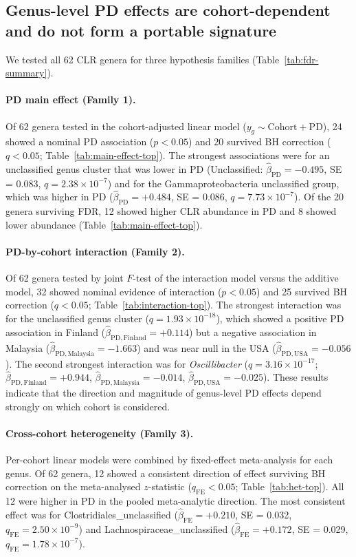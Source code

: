 \documentclass[12pt,a4paper]{article}
\begin{document}
\subsection{Genus-level PD effects are cohort-dependent and do not form
a portable signature}
\label{sec:genus}

We tested all 62 CLR genera for three hypothesis families
(Table~\ref{tab:fdr-summary}).

\paragraph{PD main effect (Family 1).}
Of 62 genera tested in the cohort-adjusted linear model
($y_g \sim \mathrm{Cohort} + \mathrm{PD}$), 24 showed a nominal PD
association ($p < 0.05$) and 20 survived BH correction ($q < 0.05$;
Table~\ref{tab:main-effect-top}). The strongest associations were for
an unclassified genus cluster that was lower in PD (Unclassified:
$\hat\beta_{\mathrm{PD}} = -0.495$, SE = 0.083, $q = 2.38 \times 10^{-7}$)
and for the Gammaproteobacteria unclassified group, which was higher in PD
($\hat\beta_{\mathrm{PD}} = +0.484$, SE = 0.086, $q = 7.73 \times 10^{-7}$).
Of the 20 genera surviving FDR, 12 showed higher CLR abundance in PD and
8 showed lower abundance (Table~\ref{tab:main-effect-top}).

\paragraph{PD-by-cohort interaction (Family 2).}
Of 62 genera tested by joint $F$-test of the interaction model versus the
additive model, 32 showed nominal evidence of interaction ($p < 0.05$) and
25 survived BH correction ($q < 0.05$; Table~\ref{tab:interaction-top}).
The strongest interaction was for the unclassified genus cluster
($q = 1.93 \times 10^{-18}$), which showed a positive PD association in
Finland ($\hat\beta_{\mathrm{PD,Finland}} = +0.114$) but a negative
association in Malaysia ($\hat\beta_{\mathrm{PD,Malaysia}} = -1.663$) and
was near null in the USA ($\hat\beta_{\mathrm{PD,USA}} = -0.056$). The
second strongest interaction was for \textit{Oscillibacter}
($q = 3.16 \times 10^{-17}$; $\hat\beta_{\mathrm{PD,Finland}} = +0.944$,
$\hat\beta_{\mathrm{PD,Malaysia}} = -0.014$,
$\hat\beta_{\mathrm{PD,USA}} = -0.025$). These results indicate that the
direction and magnitude of genus-level PD effects depend strongly on which
cohort is considered.

\paragraph{Cross-cohort heterogeneity (Family 3).}
Per-cohort linear models were combined by fixed-effect meta-analysis for
each genus. Of 62 genera, 12 showed a consistent direction of effect
surviving BH correction on the meta-analysed $z$-statistic ($q_{\mathrm{FE}}
< 0.05$; Table~\ref{tab:het-top}). All 12 were higher in PD in the pooled
meta-analytic direction. The most consistent effect was for
Clostridiales\_unclassified ($\hat\beta_{\mathrm{FE}} = +0.210$, SE = 0.032,
$q_{\mathrm{FE}} = 2.50 \times 10^{-9}$) and
Lachnospiraceae\_unclassified ($\hat\beta_{\mathrm{FE}} = +0.172$,
SE = 0.029, $q_{\mathrm{FE}} = 1.78 \times 10^{-7}$).
\end{document}
